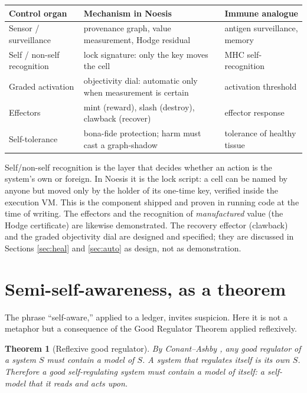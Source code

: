 \documentclass[10pt]{article}
\newtheorem{theorem}{Theorem}
\begin{document}
\begin{center}
\small
\begin{tabular}{@{}lll@{}}
\toprule
\textbf{Control organ} & \textbf{Mechanism in Noesis} & \textbf{Immune analogue} \\
\midrule
Sensor / surveillance & provenance graph, value measurement, Hodge residual & antigen surveillance, memory \\
Self / non-self recognition & lock signature: only the key moves the cell & MHC self-recognition \\
Graded activation & objectivity dial: automatic only when measurement is certain & activation threshold \\
Effectors & mint (reward), slash (destroy), clawback (recover) & effector response \\
Self-tolerance & bona-fide protection; harm must cast a graph-shadow & tolerance of healthy tissue \\
\bottomrule
\end{tabular}
\end{center}

Self/non-self recognition is the layer that decides whether an action is the system's own or foreign. In
Noesis it is the lock script: a cell can be named by anyone but moved only by the holder of its one-time
key, verified inside the execution VM. This is the component shipped and proven in running code at the
time of writing. The effectors and the recognition of \emph{manufactured} value (the Hodge certificate)
are likewise demonstrated. The recovery effector (clawback) and the graded objectivity dial are designed
and specified; they are discussed in Sections \ref{sec:heal} and \ref{sec:auto} as design, not as
demonstration.

\section{Semi-self-awareness, as a theorem}
\label{sec:aware}

The phrase ``self-aware,'' applied to a ledger, invites suspicion. Here it is not a metaphor but a
consequence of the Good Regulator Theorem applied reflexively.

\begin{theorem}[Reflexive good regulator]
By Conant--Ashby \cite{conant1970}, any good regulator of a system $S$ must contain a model of $S$. A
system that regulates \emph{itself} is its own $S$. Therefore a good self-regulating system must contain a
model of itself: a self-model that it reads and acts upon.
\end{theorem}
\end{document}

